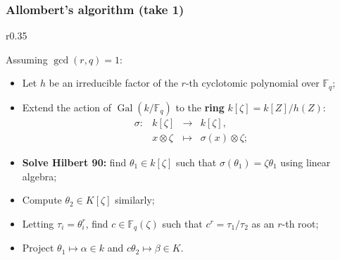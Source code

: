 \documentclass[francais]{beamer}
\def\F {\ensuremath{\mathbb{F}}}
\DeclareMathOperator{\Gal}{Gal}
\begin{document}
\begin{frame}\frametitle{Allombert's algorithm (take 1)}
      \begin{wrapfigure}[9]{r}{0.35\textwidth}
    \end{wrapfigure}
    
    Assuming $\gcd(r,q)=1$:
    \begin{itemize}
    \item Let $h$ be an irreducible factor of the $r$-th cyclotomic
      polynomial over $\F_q$;
    \item Extend the action of $\Gal(k/\F_q)$ to the \textbf{ring}
      $k[\zeta]=k[Z]/h(Z)$:
      \[\begin{array}{llll}
          \sigma: & k[\zeta] & \rightarrow & k[\zeta], \\
                  & x \otimes \zeta & \mapsto & \sigma(x) \otimes \zeta;
        \end{array}\]
    \end{itemize}

    \begin{itemize}
    \item \textbf{Solve Hilbert 90:} find $\theta_1 \in k[\zeta]$ such that
      $\sigma(\theta_1) = \zeta\theta_1$ using linear algebra;
    \item Compute $\theta_2 \in K[\zeta]$ similarly;
    \end{itemize}

    \begin{itemize}
    \item Letting $\tau_i = \theta_i^r$,
      find $c\in\F_q(\zeta)$ such that $c^r= \tau_1 / \tau_2$
      as an $r$-th root;
    \item Project $\theta_1\mapsto\alpha\in k$ and
      $c\theta_2\mapsto\beta\in K$.
    \end{itemize}
  \end{frame}
\end{document}
